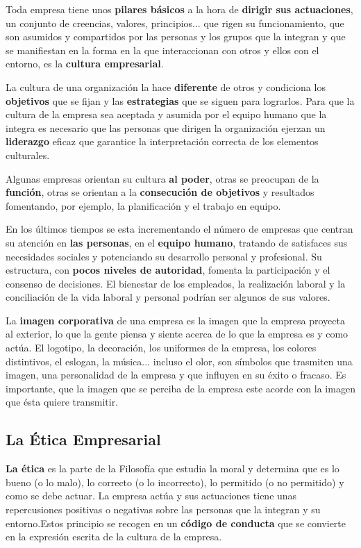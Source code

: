 Toda empresa tiene unos \textbf{pilares básicos} a la hora de \textbf{dirigir sus actuaciones}, un conjunto de creencias, valores, principios... que rigen su funcionamiento, que son asumidos y compartidos por las personas y los grupos que la integran y que se manifiestan en la forma en la que interaccionan con otros y ellos con el entorno, es la \textbf{cultura empresarial}.

La cultura de una organización la hace \textbf{diferente} de otros y condiciona los \textbf{objetivos} que se fijan y las \textbf{estrategias} que se siguen para lograrlos. Para que la cultura de la empresa sea aceptada y asumida por el equipo humano que la integra es necesario que las personas que dirigen la organización ejerzan un \textbf{liderazgo} eficaz que garantice la interpretación correcta de los elementos culturales.

Algunas empresas orientan su cultura \textbf{al poder}, otras se preocupan de la \textbf{función}, otras se orientan a la \textbf{consecución de objetivos} y resultados fomentando, por ejemplo, la planificación y el trabajo en equipo.

En los últimos tiempos se esta incrementando el número de empresas que centran su atención en \textbf{las personas}, en el \textbf{equipo humano}, tratando de satisfaces sus necesidades sociales y potenciando su desarrollo personal y profesional. Su estructura, con \textbf{pocos niveles de autoridad}, fomenta la participación y el consenso de decisiones. El bienestar de los empleados, la realización laboral y la conciliación de la vida laboral y personal podrían ser algunos de sus valores.

La \textbf{imagen corporativa} de una empresa es la imagen que la empresa proyecta al exterior, lo que la gente piensa y siente acerca de lo que la empresa es y como actúa. El logotipo, la decoración, los uniformes de la empresa, los colores distintivos, el eslogan, la música... incluso el olor, son símbolos que trasmiten una imagen, una personalidad de la empresa y que influyen en su éxito o fracaso. Es importante, que la imagen que se perciba de la empresa este acorde con la imagen que ésta quiere transmitir.

\subsection{La Ética Empresarial}
\textbf{La ética} es la parte de la Filosofía que estudia la moral y determina que es lo bueno (o lo malo), lo correcto (o lo incorrecto), lo permitido (o no permitido) y como se debe actuar. La empresa actúa y sus actuaciones tiene unas repercusiones positivas o negativas sobre las personas que la integran y su entorno.Estos principio se recogen en un \textbf{código de conducta} que se convierte en la expresión escrita de la cultura de la empresa.

